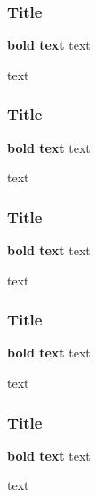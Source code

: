 \documentclass[10pt]{beamer}
\begin{document}
\begin{frame}
  \frametitle{Title}
  \textbf{bold text} text
  \par \bigskip
  text
\end{frame}

\begin{frame}
  \frametitle{Title}
  \textbf{bold text} text
  \par \bigskip
  text
\end{frame}

\begin{frame}
  \frametitle{Title}
  \textbf{bold text} text
  \par \bigskip
  text
\end{frame}

\begin{frame}
  \frametitle{Title}
  \textbf{bold text} text
  \par \bigskip
  text
\end{frame}

\begin{frame}
  \frametitle{Title}
  \textbf{bold text} text
  \par \bigskip
  text
\end{frame}
\end{document}
